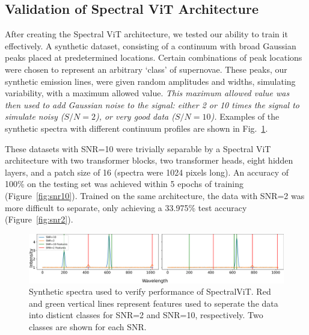\subsection{Validation of Spectral ViT Architecture}
\label{ssec:validation}
After creating the Spectral ViT architecture, we tested our  ability to train it 
effectively. A synthetic dataset, consisting of a continuum with 
broad Gaussian peaks placed at predetermined locations. Certain combinations of 
peak locations were chosen to represent an arbitrary `class' of supernovae. These peaks, 
our synthetic emission lines, were given random amplitudes and widths, simulating  
variability, with a maximum allowed value. 
\textit{ %
This maximum allowed value was then used to add 
Gaussian noise to the signal: either 2 or 10 times the signal to simulate noisy ($S/N=2$),
or very good data ($S/N=10$).
}
Examples of the synthetic spectra with different continuum profiles 
are shown in Fig.~\ref{fig:synth_spectra}. 

These datasets with SNR=10 were trivially separable by a Spectral ViT architecture 
with two transformer blocks, two transformer heads, eight hidden layers, and a patch size of 16 (spectra were 1024 pixels long). 
An accuracy of 100\% on the testing set was achieved within 5 epochs of training (Figure~\ref{fig:snr10}). Trained on the same 
architecture, the data with SNR=2 was more difficult to separate, only achieving a 33.975\% test accuracy (Figure~\ref{fig:snr2}).


\begin{figure}
    \centering
    \includegraphics[width=\textwidth]{figures/synth_data_new.png}
    \caption{Synthetic spectra used to verify performance of SpectralViT. Red and green vertical lines represent features used to 
    seperate the data into disticnt classes for SNR=2 and SNR=10, respectively. Two classes are shown for each SNR.}
    \label{fig:synth_spectra}
\end{figure}

